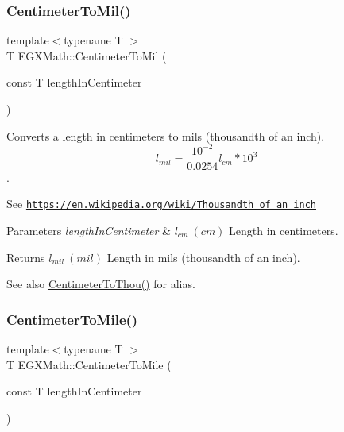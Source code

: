 \subsubsection{\texorpdfstring{Centimeter\+To\+Mil()}{CentimeterToMil()}}
{\footnotesize\ttfamily template$<$typename T $>$ \\
T E\+G\+X\+Math\+::\+Centimeter\+To\+Mil (\begin{DoxyParamCaption}\item[{const T}]{length\+In\+Centimeter }\end{DoxyParamCaption})}



Converts a length in centimeters to mils (thousandth of an inch). \[ l_{mil}= \frac{10^{-2}}{0.0254} l_{cm} * 10^{3} \]. 

See \href{https://en.wikipedia.org/wiki/Thousandth_of_an_inch}{\tt https\+://en.\+wikipedia.\+org/wiki/\+Thousandth\+\_\+of\+\_\+an\+\_\+inch} 
\begin{DoxyParams}{Parameters}
{\em length\+In\+Centimeter} & $ l_{cm}\ (cm)$ Length in centimeters. \\
\hline
\end{DoxyParams}
\begin{DoxyReturn}{Returns}
$ l_{mil}\ (mil)$ Length in mils (thousandth of an inch). 
\end{DoxyReturn}
\begin{DoxySeeAlso}{See also}
\mbox{\hyperlink{group___e_g_x_math-_conversions-_length_conversions-_centimeter-_imperial_ga06aee91cfbc90db20c6a085129dbf4fa}{Centimeter\+To\+Thou()}} for alias. 
\end{DoxySeeAlso}
\mbox{\label{group___e_g_x_math-_conversions-_length_conversions-_centimeter-_imperial_gacba2e8c1f187fae381009e4413d5d4fb}} 
\subsubsection{\texorpdfstring{Centimeter\+To\+Mile()}{CentimeterToMile()}}
{\footnotesize\ttfamily template$<$typename T $>$ \\
T E\+G\+X\+Math\+::\+Centimeter\+To\+Mile (\begin{DoxyParamCaption}\item[{const T}]{length\+In\+Centimeter }\end{DoxyParamCaption})}



